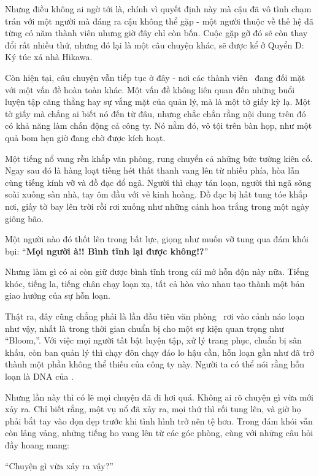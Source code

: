 \documentclass[../main.tex]{subfiles}
\begin{document}
Nhưng điều không ai ngờ tới là, chính vì quyết định này mà cậu đã vô tình chạm trán với một người mà đáng ra cậu không thể gặp - một người thuộc về thế hệ đã từng có năm thành viên nhưng giờ đây chỉ còn bốn. Cuộc gặp gỡ đó sẽ còn thay đổi rất nhiều thứ, nhưng đó lại là một câu chuyện khác, sẽ được kể ở Quyển D: Ký túc xá nhà Hikawa.

Còn hiện tại, câu chuyện vẫn tiếp tục ở đây - nơi các thành viên \hll\ đang đối mặt với một vấn đề hoàn toàn khác. Một vấn đề không liên quan đến những buổi luyện tập căng thẳng hay sự vắng mặt của quản lý, mà là một tờ giấy kỳ lạ. Một tờ giấy mà chẳng ai biết nó đến từ đâu, nhưng chắc chắn rằng nội dung trên đó có khả năng làm chấn động cả công ty. Nó nằm đó, vô tội trên bàn họp, như một quả bom hẹn giờ đang chờ được kích hoạt.

\il

Một tiếng nổ vang rền khắp văn phòng, rung chuyển cả những bức tường kiên cố. Ngay sau đó là hàng loạt tiếng hét thất thanh vang lên từ nhiều phía, hòa lẫn cùng tiếng kính vỡ và đồ đạc đổ ngã. Người thì chạy tán loạn, người thì ngã sõng soài xuống sàn nhà, tay ôm đầu với vẻ kinh hoàng. Đồ đạc bị hất tung tóe khắp nơi, giấy tờ bay lên trời rồi rơi xuống như những cánh hoa trắng trong một ngày giông bão.

Một người nào đó thốt lên trong bất lực, giọng như muốn vỡ tung qua đám khói bụi: ``\textbf{Mọi người à!! Bình tĩnh lại được không!?}''

Nhưng làm gì có ai còn giữ được bình tĩnh trong cái mớ hỗn độn này nữa. Tiếng khóc, tiếng la, tiếng chân chạy loạn xạ, tất cả hòa vào nhau tạo thành một bản giao hưởng của sự hỗn loạn.

Thật ra, đây cũng chẳng phải là lần đầu tiên văn phòng \hll\ rơi vào cảnh náo loạn như vậy, nhất là trong thời gian chuẩn bị cho một sự kiện quan trọng như ``Bloom,''. Với việc mọi người tất bật luyện tập, xử lý trang phục, chuẩn bị sân khấu, còn ban quản lý thì chạy đôn chạy đáo lo hậu cần, hỗn loạn gần như đã trở thành một phần không thể thiếu của công ty này. Người ta có thể nói rằng hỗn loạn là DNA của \hll.

Nhưng lần này thì có lẽ mọi chuyện đã đi hơi quá. Không ai rõ chuyện gì vừa mới xảy ra. Chỉ biết rằng, một vụ nổ đã xảy ra, mọi thứ thì rối tung lên, và giờ họ phải bắt tay vào dọn dẹp trước khi tình hình trở nên tệ hơn. Trong đám khói vẫn còn lảng vảng, những tiếng ho vang lên từ các góc phòng, cùng với những câu hỏi đầy hoang mang:

``Chuyện gì vừa xảy ra vậy?''
\end{document}
